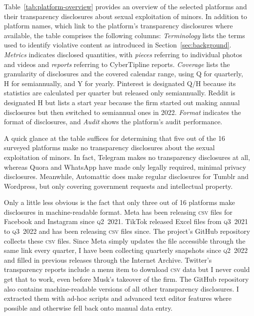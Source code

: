 \documentclass[nonacm,screen]{acmart}
\newcommand\V[1]{\textsc{\MakeLowercase{#1}}}
\begin{document}
Table~\ref{tab:platform-overview} provides an overview of the selected platforms
and their transparency disclosures about sexual exploitation of minors. In
addition to platform names, which link to the platform's transparency
disclosures where available, the table comprises the following columns:
\emph{Terminology} lists the terms used to identify violative content as
introduced in Section~\ref{sec:background}. \emph{Metrics} indicates disclosed
quantities, with \emph{pieces} referring to individual photos and videos and
\emph{reports} referring to CyberTipline reports. \emph{Coverage} lists the
granularity of disclosures and the covered calendar range, using Q for
quarterly, H for semiannually, and Y for yearly. Pinterest is designated Q/H
because its statistics are calculated per quarter but released only
semiannually. Reddit is designated H but lists a start year because the firm
started out making annual disclosures but then switched to semiannual ones in
2022. \emph{Format} indicates the format of disclosures, and \emph{Audit} shows
the platform's audit performance.

A quick glance at the table suffices for determining that five out of the 16
surveyed platforms make no transparency disclosures about the sexual
exploitation of minors. In fact, Telegram makes no transparency disclosures at
all, whereas Quora and WhatsApp have made only legally required, minimal privacy
disclosures. Meanwhile, Automattic does make regular disclosures for Tumblr and
Wordpress, but only covering government requests and intellectual property.

Only a little less obvious is the fact that only three out of 16 platforms make
disclosures in machine-readable format. Meta has been releasing \V{CSV} files
for Facebook and Instagram since \V{Q2}~2021. TikTok released Excel files from
\V{Q3}~2021 to \V{Q3}~2022 and has been releasing \V{CSV} files since. The
project's GitHub repository collects these \V{CSV} files. Since Meta simply
updates the file accessible through the same link every quarter, I have been
collecting quarterly snapshots since \V{Q2}~2022 and filled in previous releases
through the Internet Archive. Twitter's transparency reports include a menu item
to download \V{CSV} data but I never could get that to work, even before Musk's
takeover of the firm. The GitHub repository also contains machine-readable
versions of all other transparency disclosures. I extracted them with ad-hoc
scripts and advanced text editor features where possible and otherwise fell back
onto manual data entry.
\end{document}
